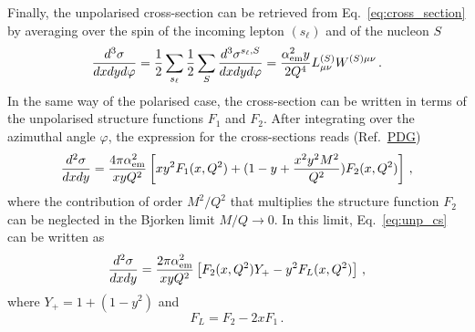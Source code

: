 Finally, the unpolarised cross-section can be retrieved from Eq.~\eqref{eq:cross_section} by averaging over the spin of the incoming lepton $(s_{\ell})$ and of the nucleon $S$
\begin{equation}
  \frac{d^3 \sigma}{dx dy d\varphi} = \frac{1}{2} \sum_{s_{\ell}} \frac{1}{2} \sum_{S} \frac{d^3 \sigma^{s_{\ell},S}}{dx dy d\varphi} = \frac{\alpha_{\textrm{em}}^2 y}{2 Q^4} L_{\mu \nu}^{(S)}W^{(S)\mu \nu}\,.
\end{equation}
In the same way of the polarised case, the cross-section can be written in terms of the unpolarised structure functions $F_1$ and $F_2$. After integrating over the azimuthal angle $\varphi$, the expression for the cross-sections reads (Ref.~\href{https://pdg.lbl.gov/2019/reviews/rpp2019-rev-structure-functions.pdf}{PDG})
\begin{equation}
  \frac{d^2 \sigma}{dx dy} = \frac{4 \pi \alpha_{\textrm{em}}^2}{xyQ^2} \left[ xy^2 F_1(x,Q^2) + (1-y + \frac{x^2y^2 M^2}{Q^2})F_{2}(x,Q^2)\right] \,,
  \label{eq:unp_cs}
\end{equation}
where the contribution of order $M^2/Q^2$ that multiplies the structure function $F_2$ can be neglected in the Bjorken limit $M/Q \rightarrow 0$. In this limit, Eq.~\eqref{eq:unp_cs} can be written as
\begin{equation}
  \frac{d^2 \sigma}{dx dy} = \frac{2 \pi \alpha_{\textrm{em}}^2}{xyQ^2} \left[ F_2(x,Q^2) Y_{+} - y^2 F_{L}(x,Q^2) \right]\,,
\end{equation} 
where $Y_{+} = 1 + (1-y^2)$ and 
\begin{equation}
  F_{L} = F_2 - 2xF_1 \,.
  \label{eq:Callan_Gross}
\end{equation}

